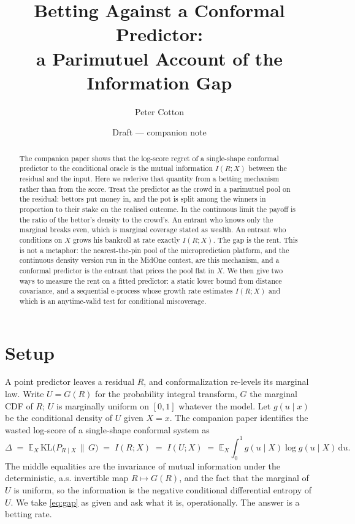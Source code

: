 \documentclass[11pt]{article}
\title{Betting Against a Conformal Predictor:\\
a Parimutuel Account of the Information Gap}
\author{Peter Cotton}
\date{Draft --- companion note}
\begin{document}
\maketitle

\begin{abstract}
The companion paper shows that the log-score regret of a single-shape conformal predictor to the
conditional oracle is the mutual information $I(R;X)$ between the residual and the input. Here we
rederive that quantity from a betting mechanism rather than from the score. Treat the predictor as
the crowd in a parimutuel pool on the residual: bettors put money in, and the pot is split among
the winners in proportion to their stake on the realised outcome. In the continuous limit the
payoff is the ratio of the bettor's density to the crowd's. An entrant who knows only the marginal
breaks even, which is marginal coverage stated as wealth. An entrant who conditions on $X$ grows
his bankroll at rate exactly $I(R;X)$. The gap is the rent. This is not a metaphor: the
nearest-the-pin pool of the microprediction platform, and the continuous density version run in the
MidOne contest, are this mechanism, and a conformal predictor is the entrant that prices the pool
flat in $X$. We then give two ways to measure the rent on a fitted predictor: a static lower bound
from distance covariance, and a sequential e-process whose growth rate estimates $I(R;X)$ and which
is an anytime-valid test for conditional miscoverage.
\end{abstract}

\section{Setup}

A point predictor leaves a residual $R$, and conformalization re-levels its marginal law. Write
$U=G(R)$ for the probability integral transform, $G$ the marginal CDF of $R$; $U$ is marginally
uniform on $[0,1]$ whatever the model. Let $g(u\mid x)$ be the conditional density of $U$ given
$X=x$. The companion paper \citep{cotton_marginally} identifies the wasted log-score of a
single-shape conformal system as
\begin{equation}\label{eq:gap}
\Delta \;=\; \mathbb E_X\,\mathrm{KL}\!\big(P_{R\mid X}\,\big\|\,G\big)
\;=\; I(R;X) \;=\; I(U;X) \;=\; \mathbb E_X\!\int_0^1 g(u\mid X)\log g(u\mid X)\,\mathrm du .
\end{equation}
The middle equalities are the invariance of mutual information under the deterministic, a.s.
invertible map $R\mapsto G(R)$, and the fact that the marginal of $U$ is uniform, so the
information is the negative conditional differential entropy of $U$. We take \eqref{eq:gap} as
given and ask what it is, operationally. The answer is a betting rate.
\end{document}
